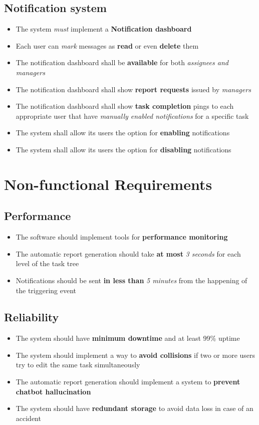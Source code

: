 \documentclass{article}
\begin{document}
\subsection{Notification system}
\begin{itemize}
    \item The system \textit{must} implement a \textbf{Notification dashboard}
    \item Each user can \textit{mark} messages as \textbf{read} or even \textbf{delete} them
    \item The notification dashboard shall be \textbf{available} for both \textit{assignees and managers}
    \item The notification dashboard shall show \textbf{report requests} issued by \textit{managers}
    \item The notification dashboard shall show \textbf{task completion} pings to each appropriate user that have \textit{manually enabled notifications} for a specific task
    \item The system shall allow its users the option for \textbf{enabling} notifications
    \item The system shall allow its users the option for \textbf{disabling} notifications
\end{itemize}

\section{Non-functional Requirements}
\subsection{Performance}
\begin{itemize}
    \item The software should implement tools for \textbf{performance monitoring}
    \item The automatic report generation should take \textbf{at most} \textit{3 seconds} for each level of the task tree
    \item Notifications should be sent \textbf{in less than} \textit{5 minutes} from the happening of the triggering event
\end{itemize}

\subsection{Reliability}
\begin{itemize}
    \item The system should have \textbf{minimum downtime} and at least 99\% uptime
    \item The system should implement a way to \textbf{avoid collisions} if two or more users try to edit the same task simultaneously
    \item The automatic report generation should implement a system to \textbf{prevent chatbot hallucination}
    \item The system should have \textbf{redundant storage} to avoid data loss in case of an accident
\end{itemize}
\end{document}

